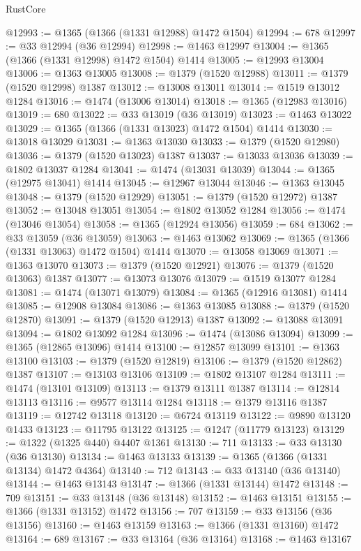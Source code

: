 \begin{lexlean}{RustCore}
\begin{coremodule}
@12993 := @1365 (@1366 (@1331 @12988) @1472 @1504)
@12994 := 678
@12997 := @33 @12994 (@36 @12994)
@12998 := @1463 @12997
@13004 := @1365 (@1366 (@1331 @12998) @1472 @1504) @1414
@13005 := @12993 @13004
@13006 := @1363 @13005
@13008 := @1379 (@1520 @12988)
@13011 := @1379 (@1520 @12998) @1387
@13012 := @13008 @13011
@13014 := @1519 @13012 @1284
@13016 := @1474 (@13006 @13014)
@13018 := @1365 (@12983 @13016)
@13019 := 680
@13022 := @33 @13019 (@36 @13019)
@13023 := @1463 @13022
@13029 := @1365 (@1366 (@1331 @13023) @1472 @1504) @1414
@13030 := @13018 @13029
@13031 := @1363 @13030
@13033 := @1379 (@1520 @12980)
@13036 := @1379 (@1520 @13023) @1387
@13037 := @13033 @13036
@13039 := @1802 @13037 @1284
@13041 := @1474 (@13031 @13039)
@13044 := @1365 (@12975 @13041) @1414
@13045 := @12967 @13044
@13046 := @1363 @13045
@13048 := @1379 (@1520 @12929)
@13051 := @1379 (@1520 @12972) @1387
@13052 := @13048 @13051
@13054 := @1802 @13052 @1284
@13056 := @1474 (@13046 @13054)
@13058 := @1365 (@12924 @13056)
@13059 := 684
@13062 := @33 @13059 (@36 @13059)
@13063 := @1463 @13062
@13069 := @1365 (@1366 (@1331 @13063) @1472 @1504) @1414
@13070 := @13058 @13069
@13071 := @1363 @13070
@13073 := @1379 (@1520 @12921)
@13076 := @1379 (@1520 @13063) @1387
@13077 := @13073 @13076
@13079 := @1519 @13077 @1284
@13081 := @1474 (@13071 @13079)
@13084 := @1365 (@12916 @13081) @1414
@13085 := @12908 @13084
@13086 := @1363 @13085
@13088 := @1379 (@1520 @12870)
@13091 := @1379 (@1520 @12913) @1387
@13092 := @13088 @13091
@13094 := @1802 @13092 @1284
@13096 := @1474 (@13086 @13094)
@13099 := @1365 (@12865 @13096) @1414
@13100 := @12857 @13099
@13101 := @1363 @13100
@13103 := @1379 (@1520 @12819)
@13106 := @1379 (@1520 @12862) @1387
@13107 := @13103 @13106
@13109 := @1802 @13107 @1284
@13111 := @1474 (@13101 @13109)
@13113 := @1379 @13111 @1387
@13114 := @12814 @13113
@13116 := @9577 @13114 @1284
@13118 := @1379 @13116 @1387
@13119 := @12742 @13118
@13120 := @6724 @13119
@13122 := @9890 @13120 @1433
@13123 := @11795 @13122
@13125 := @1247 (@11779 @13123)
@13129 := @1322 (@1325 @440) @4407 @1361
@13130 := 711
@13133 := @33 @13130 (@36 @13130)
@13134 := @1463 @13133
@13139 := @1365 (@1366 (@1331 @13134) @1472 @4364)
@13140 := 712
@13143 := @33 @13140 (@36 @13140)
@13144 := @1463 @13143
@13147 := @1366 (@1331 @13144) @1472
@13148 := 709
@13151 := @33 @13148 (@36 @13148)
@13152 := @1463 @13151
@13155 := @1366 (@1331 @13152) @1472
@13156 := 707
@13159 := @33 @13156 (@36 @13156)
@13160 := @1463 @13159
@13163 := @1366 (@1331 @13160) @1472
@13164 := 689
@13167 := @33 @13164 (@36 @13164)
@13168 := @1463 @13167

\end{coremodule}
\end{lexlean}
